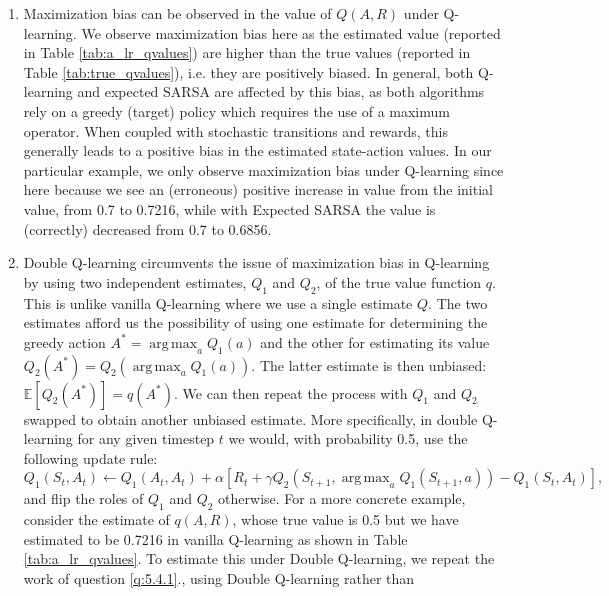 \documentclass{article}
\DeclareMathOperator*{\argmax}{arg\,max}
\begin{document}
\begin{enumerate}
\begin{table}[ht]
\begin{tabular}{@{}cccccc@{}}
		      \end{tabular}
	      \end{table}
	\item Maximization bias can be observed in the value of $Q(A, R)$ under Q-learning. We observe
	      maximization bias here as the estimated value (reported in Table \ref{tab:a_lr_qvalues}) are
	      higher than the true values (reported in Table \ref{tab:true_qvalues}), i.e. they are positively
	      biased. In general, both Q-learning and expected SARSA are affected by this bias, as both
	      algorithms rely on a greedy (target) policy which requires the use of a maximum operator. When
	      coupled with stochastic transitions and rewards, this generally leads to a positive bias in the
	      estimated state-action values. In our particular example, we only observe maximization bias
	      under Q-learning since here because we see an (erroneous) positive increase in value from the
	      initial value, from 0.7 to 0.7216, while with Expected SARSA the value is (correctly) decreased
	      from 0.7 to 0.6856.
	\item Double Q-learning circumvents the issue of maximization bias in Q-learning by using two
	      independent estimates, $Q_1$ and $Q_2$, of the true value function $q$. This is unlike
	      vanilla Q-learning where we use a single estimate $Q$. The two estimates afford us the
	      possibility of using one estimate for determining the greedy action $A^* = \argmax_aQ_1(a)$
	      and the other for estimating its value $Q_2(A^*) = Q_2(\argmax_aQ_1(a))$. The latter estimate
	      is then unbiased: $\mathbb{E}\left[Q_2(A^*)\right] = q(A^*)$. We can then repeat the process
	      with $Q_1$ and $Q_2$ swapped to obtain another unbiased estimate. More specifically, in
	      double Q-learning for any given timestep $t$ we would, with probability 0.5, use the
	      following update rule:
	      \begin{equation}
		      Q_1(S_t, A_t) \leftarrow Q_1(A_t, A_t) + \alpha \left[ R_t + \gamma Q_2(S_{t+1},
			      \argmax_{a}Q_1(S_{t+1}, a)) - Q_1(S_t, A_t) \right],
	      \end{equation}
	      and flip the roles of $Q_1$ and $Q_2$ otherwise. For a more concrete example, consider the
	      estimate of $q(A, R)$, whose true value is 0.5 but we have estimated to be 0.7216 in vanilla
	      Q-learning as shown in Table \ref{tab:a_lr_qvalues}. To estimate this under Double
	      Q-learning, we repeat the work of question \ref{q:5.4.1}., using Double Q-learning rather than

\end{enumerate}
\end{document}
